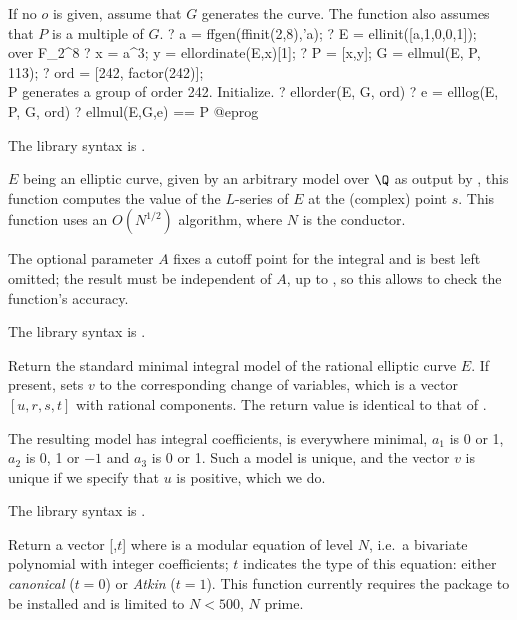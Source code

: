 If no $o$ is given, assume that $G$ generates the curve.
The function also assumes that $P$ is a multiple of $G$.
\bprog
? a = ffgen(ffinit(2,8),'a);
? E = ellinit([a,1,0,0,1]);  \\ over F_{2^8}
? x = a^3; y = ellordinate(E,x)[1];
? P = [x,y]; G = ellmul(E, P, 113);
? ord = [242, factor(242)]; \\ P generates a group of order 242. Initialize.
? ellorder(E, G, ord)
? e = elllog(E, P, G, ord)
? ellmul(E,G,e) == P
@eprog

The library syntax is .

\label{se:elllseries}
$E$ being an elliptic curve, given by an arbitrary model over $\Q$ as output
by , this function computes the value of the $L$-series of $E$ at
the (complex) point $s$. This function uses an $O(N^{1/2})$ algorithm, where
$N$ is the conductor.

The optional parameter $A$ fixes a cutoff point for the integral and is best
left omitted; the result must be independent of $A$, up to
, so this allows to check the function's accuracy.

The library syntax is .

\label{se:ellminimalmodel}
Return the standard minimal integral model of the rational elliptic
curve $E$. If present, sets $v$ to the corresponding change of variables,
which is a vector $[u,r,s,t]$ with rational components. The return value is
identical to that of .

The resulting model has integral coefficients, is everywhere minimal, $a_1$
is 0 or 1, $a_2$ is 0, 1 or $-1$ and $a_3$ is 0 or 1. Such a model is
unique, and the vector $v$ is unique if we specify that $u$ is positive,
which we do. 

The library syntax is .

\label{se:ellmodulareqn}
Return a vector [,$t$] where  is a modular equation of
level $N$, i.e.~a bivariate polynomial with integer coefficients; $t$
indicates the type of this equation: either \emph{canonical} ($t = 0$) or
\emph{Atkin} ($t = 1$). This function currently requires the package
 to be installed and is limited to $N<500$, $N$ prime.

